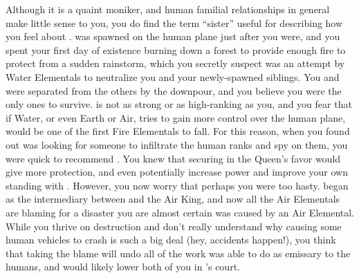 \documentclass[char]{elementals}
\begin{document}
Although it is a quaint moniker, and human familial relationships in general make little sense to you, you do find the term ``sister'' useful for describing how you feel about \cJuliet{}.  \cJuliet{\They} was spawned on the human plane just after you were, and you spent your first day of existence burning down a forest to provide enough fire to protect \cJuliet{\them} from a sudden rainstorm, which you secretly suspect was an attempt by Water Elementals to neutralize you and your newly-spawned siblings.  You and \cJuliet{} were separated from the others by the downpour, and you believe you were the only ones to survive. \cJuliet{\they} is not as strong or as high-ranking as you, and you fear that if Water, or even Earth or Air, tries to gain more control over the human plane, \cJuliet{\they} would be one of the first Fire Elementals to fall. For this reason, when you found out \cQueen{} was looking for someone to infiltrate the human ranks and spy on them, you were quick to recommend \cJuliet{}.  You knew that securing \cJuliet{\them} in the Queen's favor would give \cJuliet{\them} more protection, and even potentially increase \cJuliet{\their} power and improve your own standing with \cQueen{}.  However, you now worry that perhaps you were too hasty.  \cJuliet{} began as the intermediary between \cQueen{} and the Air King, and now all the Air Elementals are blaming \cJuliet{\them} for a disaster you are almost certain was caused by an Air Elemental.  While you thrive on destruction and don't really understand why causing some human vehicles to crash is such a big deal (hey, accidents happen!), you think that \cJuliet{} taking the blame will undo all of the work \cJuliet{\they} was able to do as emissary to the humans, and would likely lower both of you in \cQueen{}'s court.
\end{document}
